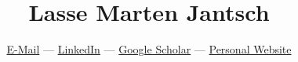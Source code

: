 \documentclass[11pt]{article}
\date{}
\begin{document}
\raggedright

\title{\Huge{\textbf{Lasse Marten Jantsch}}}

\author{\small \href{mailto:lassejantsch@knu.ac.kr}{E-Mail} --- \href{https://linkedin.com/in/lasse-jantsch}{LinkedIn} --- \href{https://scholar.google.com/citations?user=FjrsTUUAAAAJ}{Google Scholar} --- \href{lmjantsch.github.io}{Personal Website}}

\maketitle
\thispagestyle{fancy}


\end{document}
